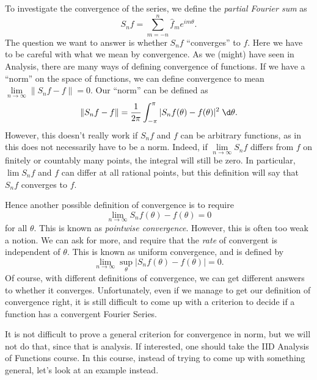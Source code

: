 \documentclass[a4paper]{article}
\begin{document}
To investigate the convergence of the series, we define the \emph{partial Fourier sum} as
\[
  S_n f = \sum_{m = -n}^n \hat{f}_m e^{im\theta}.
\]
The question we want to answer is whether $S_n f$ ``converges'' to $f$. Here we have to be careful with what we mean by convergence. As we (might) have seen in Analysis, there are many ways of defining convergence of functions. If we have a ``norm'' on the space of functions, we can define convergence to mean $\lim\limits_{n\to \infty}\|S_n f - f\| = 0$. Our ``norm'' can be defined as
\[
  \|S_n f - f\| = \frac{1}{2\pi}\int_{-\pi}^\pi |S_n f(\theta) - f(\theta)|^2 \;\d \theta.
\]
However, this doesn't really work if $S_n f$ and $f$ can be arbitrary functions, as in this does not necessarily have to be a norm. Indeed, if $\lim\limits_{n \to \infty}S_n f$ differs from $f$ on finitely or countably many points, the integral will still be zero. In particular, $\lim S_n f$ and $f$ can differ at all rational points, but this definition will say that $S_n f$ converges to $f$.

Hence another possible definition of convergence is to require
\[
  \lim_{n \to \infty}S_n f(\theta) - f(\theta) = 0
\]
for all $\theta$. This is known as \emph{pointwise convergence}. However, this is often too weak a notion. We can ask for more, and require that the \emph{rate} of convergent is independent of $\theta$. This is known as uniform convergence, and is defined by
\[
  \lim_{n \to \infty}\sup_{\theta} |S_n f(\theta) - f(\theta)| = 0.
\]
Of course, with different definitions of convergence, we can get different answers to whether it converges. Unfortunately, even if we manage to get our definition of convergence right, it is still difficult to come up with a criterion to decide if a function has a convergent Fourier Series.

It is not difficult to prove a general criterion for convergence in norm, but we will not do that, since that is analysis. If interested, one should take the IID Analysis of Functions course. In this course, instead of trying to come up with something general, let's look at an example instead.
\end{document}

